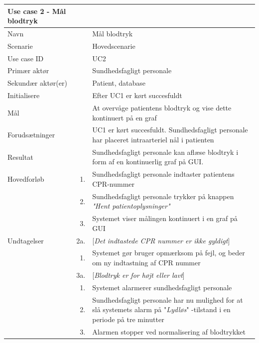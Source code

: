 \begin{longtabu} to 
\toprule
    {\large \textbf{Use case 2 - Mål blodtryk}} && \\
    \toprule
    Navn &&    Mål blodtryk\\
    Scenarie &&    Hovedscenarie\\
    Use case ID &&    UC2\\
    Primær aktør &&    Sundhedsfagligt personale\\
    Sekundær aktør(er) &&    Patient, database\\
    Initialisere &&    Efter UC1 er kørt succesfuldt\\
    Mål &&    At overvåge patientens blodtryk og vise dette kontinuert på en graf\\
    Forudsætninger &&    UC1 er kørt succesfuldt. Sundhedsfagligt personale har placeret intraarteriel nål i patienten\\
    Resultat &&    Sundhedsfagligt personale kan aflæse blodtryk i form af en kontinuerlig graf på GUI.\\
    \toprule
    Hovedforløb &    1. &    Sundhedsfagligt personale indtaster patientens CPR-nummer\\[-1ex]
    			&    2. &    Sundhedsfagligt personale trykker på knappen \textit{"Hent patientoplysninger"}\\[-1ex]
                &    3. &    Systemet viser målingen kontinuert i en graf på GUI\\
    \toprule
    Undtagelser &    2a. &    [\textit{Det indtastede CPR nummer er ikke gyldigt}]\\[-1ex]
    &	1. &	Systemet gør bruger opmærksom på fejl, og beder om ny indtastning af CPR nummer\\[-1ex]
    &	3a.	&	[\textit{Blodtryk er for højt eller lavt}]\\[-1ex]
    &	1.	&	Systemet alarmerer sundhedsfagligt personale\\[-1ex]
    &	2.	&	Sundhedsfagligt personale har nu mulighed for at slå systemets alarm på "\textit{Lydløs}"\- -tilstand i en periode på tre minutter\\[-1ex]
    &	3.	&	Alarmen stopper ved normalisering af blodtrykket\\
                \toprule
       

\end{longtabu}
